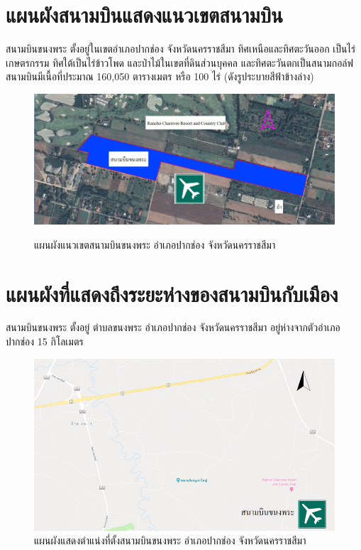 \section{แผนผังสนามบินแสดงแนวเขตสนามบิน} \label{แผนผังสนามบินแสดงแนวเขตสนามบิน}

สนามบินขนงพระ ตั้งอยู่ในเขตอำเภอปากช่อง จังหวัดนครราชสีมา  ทิศเหนือและทิศตะวันออก เป็นไร่เกษตรกรรม ทิศใต้เป็นไร่ข้าวโพด และป่าไม้ในเขตที่ดินส่วนบุคคล  และทิศตะวันตกเป็นสนามกอล์ฟ  สนามบินมีเนื้อที่ประมาณ 160,050 ตารางเมตร หรือ 100 ไร่ (ดังรูประบายสีฟ้าข้างล่าง)                                      

\begin{figure}[h!]
\begin{center}
\includegraphics[width=\linewidth]{images/Picture5.png}
\caption{แผนผังแนวเขตสนามบินขนงพระ อำเภอปากช่อง จังหวัดนครราชสีมา}\label{แผนผังแนวเขตสนามบินขนงพระ อำเภอปากช่อง จังหวัดนครราชสีมา}
\label{default}
\end{center}
\end{figure}

\newpage
\section{แผนผังที่แสดงถึงระยะห่างของสนามบินกับเมือง}
	สนามบินขนงพระ ตั้งอยู่ ตำบลขนงพระ อำเภอปากช่อง  จังหวัดนครราชสีมา อยู่ห่างจากตัวอำเภอปากช่อง  15 กิโลเมตร 
\begin{figure}[ht!]
\begin{center}
\includegraphics[width=\linewidth]{images/Picture6.png}
\caption{แผนผังแสดงตำแน่งที่ตั้งสนามบินขนงพระ อำเภอปากช่อง  จังหวัดนครราชสีมา}
\label{default}
\end{center}
\end{figure}

